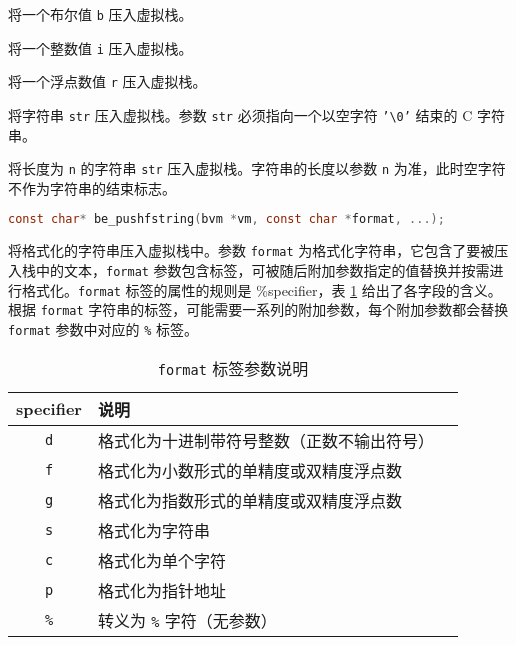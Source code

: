
将一个布尔值 \texttt{b} 压入虚拟栈。


将一个整数值 \texttt{i} 压入虚拟栈。


将一个浮点数值 \texttt{r} 压入虚拟栈。


将字符串 \texttt{str} 压入虚拟栈。参数 \texttt{str} 必须指向一个以空字符 \texttt{'\textbackslash 0'} 结束的 C 字符串。


将长度为 \texttt{n} 的字符串 \texttt{str} 压入虚拟栈。字符串的长度以参数 \texttt{n} 为准，此时空字符不作为字符串的结束标志。


\begin{lstlisting}[language=c, style=berry, numbers=none]
const char* be_pushfstring(bvm *vm, const char *format, ...);
\end{lstlisting}

将格式化的字符串压入虚拟栈中。参数 \texttt{format} 为格式化字符串，它包含了要被压入栈中的文本，\texttt{format} 参数包含标签，可被随后附加参数指定的值替换并按需进行格式化。\texttt{format} 标签的属性的规则是 \textsf{\%specifier}，表 \ref{tab::format_specifier} 给出了各字段的含义。根据 \texttt{format} 字符串的标签，可能需要一系列的附加参数，每个附加参数都会替换 \texttt{format} 参数中对应的 \texttt{\%} 标签。
\begin{table}[htb]
    \centering
    \setlength{\tabcolsep}{3mm}
    \begin{tabular}{cll} \toprule
        \textbf{\textsf{specifier}} & \textbf{说明} \\ \midrule
        \texttt{d} & 格式化为十进制带符号整数（正数不输出符号） \\
        \texttt{f} & 格式化为小数形式的单精度或双精度浮点数 \\
        \texttt{g} & 格式化为指数形式的单精度或双精度浮点数 \\
        \texttt{s} & 格式化为字符串 \\
        \texttt{c} & 格式化为单个字符 \\
        \texttt{p} & 格式化为指针地址 \\
        \texttt{\%} & 转义为 \texttt{\%} 字符（无参数） \\
        \bottomrule
    \end{tabular}
    \caption{\texttt{format} 标签参数说明}
    \label{tab::format_specifier}
\end{table}

